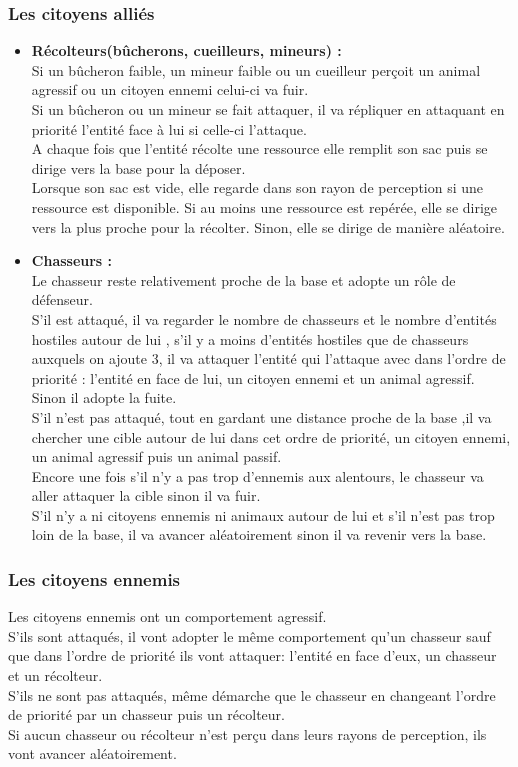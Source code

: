 \documentclass[a4paper]{memoir}
\begin{document}
				\subsubsection{Les citoyens alliés}
					\begin{itemize}[label=$\bullet$]
						\item \textbf{Récolteurs(bûcherons, cueilleurs, mineurs) :} \\ Si un bûcheron faible, un mineur faible ou un cueilleur perçoit un animal agressif ou un citoyen ennemi celui-ci va fuir.\\
							Si un bûcheron ou un mineur se fait attaquer, il va répliquer en attaquant en priorité l'entité face à lui si celle-ci l'attaque.\\
							A chaque fois que l'entité récolte une ressource elle remplit son sac puis se dirige vers la base pour la déposer.\\
							Lorsque son sac est vide, elle regarde dans son rayon de perception si une ressource est disponible. Si au moins une ressource est repérée, elle se dirige vers la plus proche pour la récolter. Sinon, elle se dirige de manière aléatoire.
						\item \textbf{Chasseurs :} \\ Le chasseur reste relativement proche de la base et adopte un rôle de défenseur.\\
							S'il est attaqué, il va regarder le nombre de chasseurs et le nombre d'entités hostiles autour de lui , s'il y a moins d'entités hostiles que de chasseurs auxquels on ajoute 3, il va attaquer l'entité qui l'attaque avec dans l'ordre de priorité : l'entité en face de lui, un citoyen ennemi et un animal agressif. Sinon il adopte la fuite.\\
							S'il n'est pas attaqué, tout en gardant une distance proche de la base ,il va chercher une cible autour de lui dans cet ordre de priorité, un citoyen ennemi, un animal agressif puis un animal passif.\\
							Encore une fois s'il n'y a pas trop d'ennemis aux alentours, le chasseur va aller attaquer la cible sinon il va fuir.\\
							S'il n'y a ni citoyens ennemis ni animaux autour de lui et s'il n'est pas trop loin de la base, il va avancer aléatoirement sinon il va revenir vers la base.
					\end{itemize}
		
				\subsubsection{Les citoyens ennemis}
					Les citoyens ennemis ont un comportement agressif.\\
					S'ils sont attaqués, il vont adopter le même comportement qu'un chasseur sauf que dans l'ordre de priorité ils vont attaquer: l'entité en face d'eux, un chasseur et un récolteur.\\
					S'ils ne sont pas attaqués, même démarche que le chasseur en changeant l'ordre de priorité par un chasseur puis un récolteur.\\
					Si aucun chasseur ou récolteur n'est perçu dans leurs rayons de perception, ils vont avancer aléatoirement.
			
\end{document}
